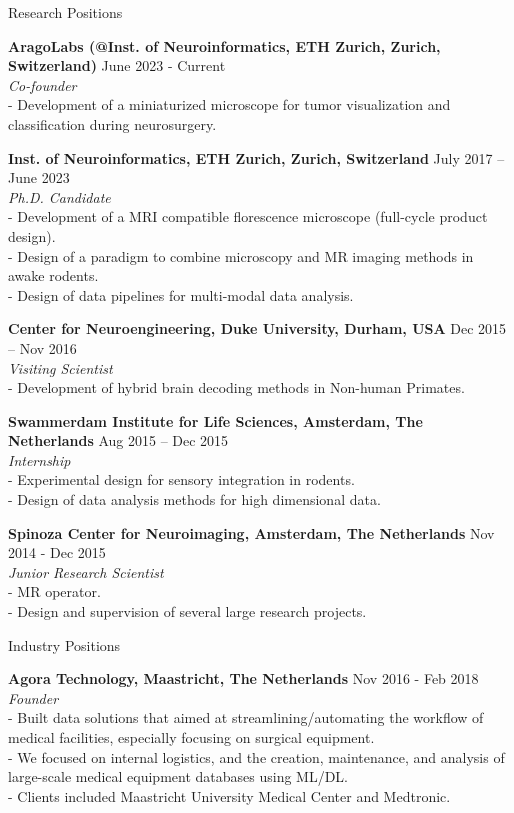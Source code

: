 \documentclass{resume}
\begin{document}
\begin{sections}{Research Positions}

{\bf AragoLabs (@Inst. of Neuroinformatics, ETH Zurich, Zurich, Switzerland)} \hfill {June 2023 - Current} 
\\{\textit{Co-founder}}
\\- Development of a miniaturized microscope for tumor visualization and classification during neurosurgery.

{\bf Inst. of Neuroinformatics, ETH Zurich, Zurich, Switzerland} \hfill {July 2017 – June 2023} 
\\{\textit{Ph.D. Candidate}}
\\- Development of a MRI compatible florescence microscope (full-cycle product design).
\\- Design of a paradigm to combine microscopy and MR imaging methods in awake rodents. 
\\- Design of data pipelines for multi-modal data analysis.

{\bf Center for Neuroengineering, Duke University, Durham, USA} \hfill {Dec 2015 – Nov 2016} 
\\{\textit{Visiting Scientist}}
\\- Development of hybrid brain decoding methods in Non-human Primates.

{\bf Swammerdam Institute for Life Sciences, Amsterdam, The Netherlands} \hfill {Aug 2015 – Dec 2015} 
\\{\textit{Internship}}
\\- Experimental design for sensory integration in rodents.
\\- Design of data analysis methods for high dimensional data.

{\bf Spinoza Center for Neuroimaging, Amsterdam, The Netherlands} \hfill {Nov 2014 - Dec 2015} 
\\{\textit{Junior Research Scientist}}
\\- MR operator.
\\- Design and supervision of several large research projects.

\end{sections}

\cleardoublepage

\begin{sections}{Industry Positions}

{\bf Agora Technology, Maastricht, The Netherlands} \hfill {Nov 2016 - Feb 2018} 
\\{\textit{Founder}}
\\- Built data solutions that aimed at streamlining/automating the workflow of medical facilities, especially focusing on surgical equipment.
\\- We focused on internal logistics, and the creation, maintenance, and analysis of large-scale medical equipment databases using ML/DL.
\\- Clients included Maastricht University Medical Center and Medtronic. 

\end{sections}
\end{document}
